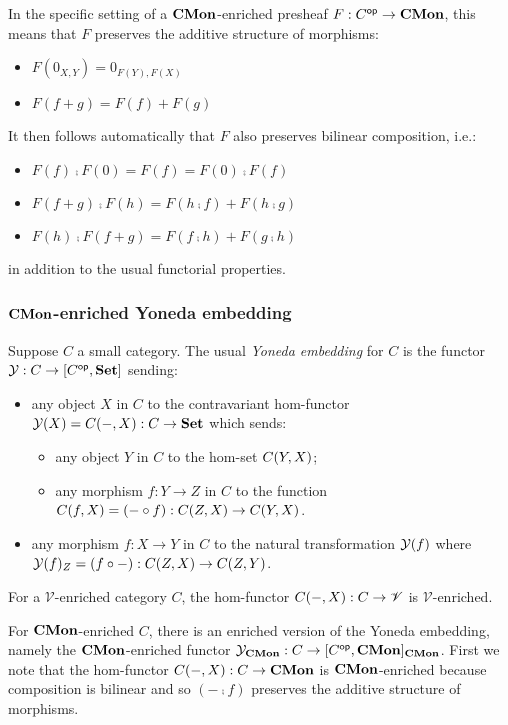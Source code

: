 In the specific setting of a $\mathbf{CMon}$-enriched presheaf $F: C^{\mathsf{op}} \to \mathbf{CMon}$, this means that $F$ preserves the
additive structure of morphisms:
\begin{itemize}
\item $F(0_{X,Y}) = 0_{F(Y),F(X)}$
\item $F(f + g) = F(f) + F(g)$
\end{itemize}
It then follows automatically that $F$ also preserves bilinear composition, i.e.:
\begin{itemize}
\item $F(f) \comp F(0) = F(f) = F(0) \comp F(f)$
\item $F(f + g) \comp F(h) = F(h \comp f) + F(h \comp g)$
\item $F(h) \comp F(f + g) = F(f \comp h) + F(g \comp h)$
\end{itemize}
in addition to the usual functorial properties.

\subsubsection{$\mathbf{CMon}$-enriched Yoneda embedding}

Suppose $C$ a small category. The usual \emph{Yoneda embedding} for $C$ is the functor $\mathcal{Y}: C \to
[C^{\mathsf{op}},\mathbf{Set}]$ sending:
\begin{itemize}
\item any object $X$ in $C$ to the contravariant hom-functor $\mathcal{Y}(X) = {C}(-,X): C \to \mathbf{Set}$ which
sends:
   \begin{itemize}
   \item any object $Y$ in $C$ to the hom-set ${C}(Y,X)$;
   \item any morphism $f: Y \to Z$ in $C$ to the function ${C}(f,X) = (- \circ f): {C}(Z,X) \to
   {C}(Y,X)$.
   \end{itemize}
\item any morphism $f: X \to Y$ in $C$ to the natural transformation $\mathcal{Y}(f)$ where $\mathcal{Y}(f)_Z = (f
\circ -): {C}(Z,X) \to {C}(Z,Y)$.
\end{itemize}

\noindent For a $\mathscr{V}$-enriched category $C$, the hom-functor ${C}(-,X): C \to \mathscr{V}$ is
$\mathscr{V}$-enriched.

\noindent For $\mathbf{CMon}$-enriched $C$, there is an enriched version of the Yoneda embedding, namely the
$\mathbf{CMon}$-enriched functor $\mathcal{Y}_{\mathbf{CMon}}: C \to [C^{\mathsf{op}},\mathbf{CMon}]_{\mathbf{CMon}}$. First we note that the
hom-functor ${C}(-,X): C \to \mathbf{CMon}$ is $\mathbf{CMon}$-enriched because composition is bilinear and so $(- \comp
f)$ preserves the additive structure of morphisms.
